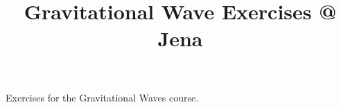 \documentclass[11pt]{article}
\title{Gravitational Wave Exercises @ Jena}
\begin{document}
\maketitle

Exercises for the Gravitational Waves course. 



\printbibliography
\end{document}
